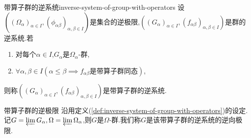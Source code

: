 \begin{definition}{带算子群的逆系统}{inverse-system-of-group-with-operators}
	设$\left(\left(\Omega_{\alpha}\right)_{\alpha\in I},\left(\phi_{\alpha\beta}\right)_{\alpha,\beta\in I}\right)$是集合的逆极限,$\left(\left(G_{\alpha}\right)_{\alpha\in I},\left(f_{\alpha\beta}\right)_{\alpha,\beta\in I}\right)$是群的逆系统.若
	\begin{enumerate}
		\item 对每个$\alpha\in I$,$G_{\alpha}$是$\Omega_{\alpha}$-群,
		\item $\forall\alpha,\beta\in I\left(\alpha\leq\beta\implies f_{\alpha\beta}\text{是带算子群同态}\right)$,
	\end{enumerate}
	则称$\left(\left(G_{\alpha}\right)_{\alpha\in I},\left(f_{\alpha\beta}\right)_{\alpha,\beta\in I}\right)$是带算子群的逆系统.
\end{definition}

\begin{definition}{带算子群的逆极限}{}
	沿用定义(\cref{def:inverse-system-of-group-with-operators})的设定.记$G=\varprojlim G_{\alpha},\Omega=\varprojlim \Omega_{\alpha}$,则$G$是$\Omega$-群.我们称$G$是该带算子群的逆系统的逆向极限.
\end{definition}












